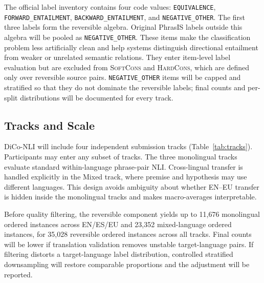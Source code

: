 \documentclass[11pt]{article}
\newcommand{\SoftCons}{\textsc{SoftCons}}
\newcommand{\HardCons}{\textsc{HardCons}}
\begin{document}
The official label inventory contains four code values:
\texttt{EQUIVALENCE}, \texttt{FORWARD\_ENTAILMENT}, \texttt{BACKWARD\_ENTAILMENT}, and \texttt{NEGATIVE\_OTHER}.
The first three labels form the reversible algebra.
Original PhrasIS labels outside this algebra will be pooled as \texttt{NEGATIVE\_OTHER}.
These items make the classification problem less artificially clean and help systems distinguish directional entailment from weaker or unrelated semantic relations.
They enter item-level label evaluation but are excluded from \SoftCons{} and \HardCons{}, which are defined only over reversible source pairs.
\texttt{NEGATIVE\_OTHER} items will be capped and stratified so that they do not dominate the reversible labels; final counts and per-split distributions will be documented for every track.

\subsection{Tracks and Scale}

DiCo-NLI will include four independent submission tracks (Table~\ref{tab:tracks}).
Participants may enter any subset of tracks.
The three monolingual tracks evaluate standard within-language phrase-pair NLI.
Cross-lingual transfer is handled explicitly in the Mixed track, where premise and hypothesis may use different languages.
This design avoids ambiguity about whether EN--EU transfer is hidden inside the monolingual tracks and makes macro-averages interpretable.

\begin{table}[t]
\centering
\small
{}
\caption{Planned DiCo-NLI tracks.}
\label{tab:tracks}
\end{table}

Before quality filtering, the reversible component yields up to 11,676 monolingual ordered instances across EN/ES/EU and 23,352 mixed-language ordered instances, for 35,028 reversible ordered instances across all tracks.
Final counts will be lower if translation validation removes unstable target-language pairs.
If filtering distorts a target-language label distribution, controlled stratified downsampling will restore comparable proportions and the adjustment will be reported.
\end{document}
